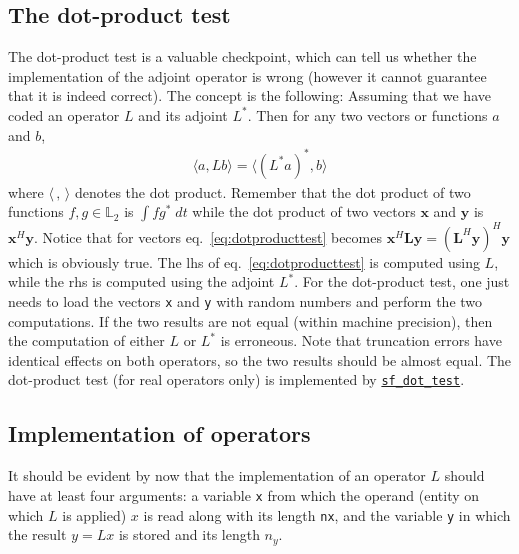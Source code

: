 \subsection{The dot-product test}\label{sec:dot-product test}
The dot-product test is a valuable checkpoint, which can tell us whether the implementation of the adjoint operator is wrong (however it cannot guarantee that it is indeed correct). The concept is the following: Assuming that we have coded an operator $L$ and its adjoint $L^*$. Then for any two vectors or functions $a$ and $b$,
\begin{gather}\label{eq:dotproducttest}
	\langle a,Lb\rangle = \langle(L^*a)^*,b\rangle
\end{gather} 
where $\langle\,,\,{}\rangle$ denotes the dot product. Remember that the dot product of two functions $f,g\in \mathds L_2$ is $\int fg^*\;dt$ while the dot product of two vectors $\mathbf{x}$ and $\mathbf{y}$ is $\mathbf{x}^H\mathbf{y}$. Notice that for vectors eq.~\eqref{eq:dotproducttest} becomes $\mathbf{x}^H\mathbf{Ly} = (\mathbf{L}^H\mathbf{y})^H\mathbf{y}$ which is obviously true.
The lhs of eq.~\eqref{eq:dotproducttest} is computed using $L$, while the rhs is computed using the adjoint $L^*$. For the dot-product test, one just needs to load the vectors \texttt{x} and \texttt{y} with random numbers and perform the two computations. If the two results are not equal (within machine precision), then the computation of either $L$ or $L^*$ is erroneous. Note that truncation errors have identical effects on both operators, so the two results should be almost equal. The dot-product test (for real operators only) is implemented by \hyperref[sec:sf_dot_test]{\texttt{sf\_dot\_test}}.

\subsection{Implementation of operators}
It should be evident by now that the implementation of an operator $L$ should have at least four arguments: a variable \texttt{x} from which the operand (entity on which $L$ is applied) $x$ is read along with its length \texttt{nx}, and the variable \texttt{y} in which the result $y=Lx$ is stored and its length $n_y$. 

